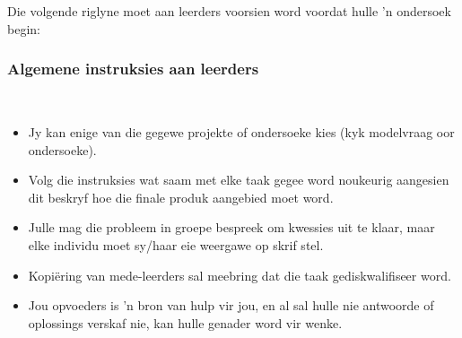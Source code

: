 Die volgende riglyne moet aan leerders voorsien word voordat hulle 'n ondersoek begin:

\subsubsection{Algemene instruksies aan leerders}\\
\begin{itemize}[noitemsep]
\item
Jy kan enige van die gegewe projekte of ondersoeke kies (kyk modelvraag oor ondersoeke).
\item Volg die instruksies wat saam met elke taak gegee word noukeurig aangesien dit beskryf hoe die finale produk aangebied moet word.
\item Julle mag die probleem in groepe bespreek om kwessies uit te klaar, maar elke individu moet sy/haar eie weergawe op skrif stel.
\item Kopiëring van mede-leerders sal meebring dat die taak gediskwalifiseer word.
\item Jou opvoeders is 'n bron van hulp vir jou, en al sal hulle nie antwoorde of oplossings verskaf nie, kan  hulle genader word vir wenke.\end{itemize}	

